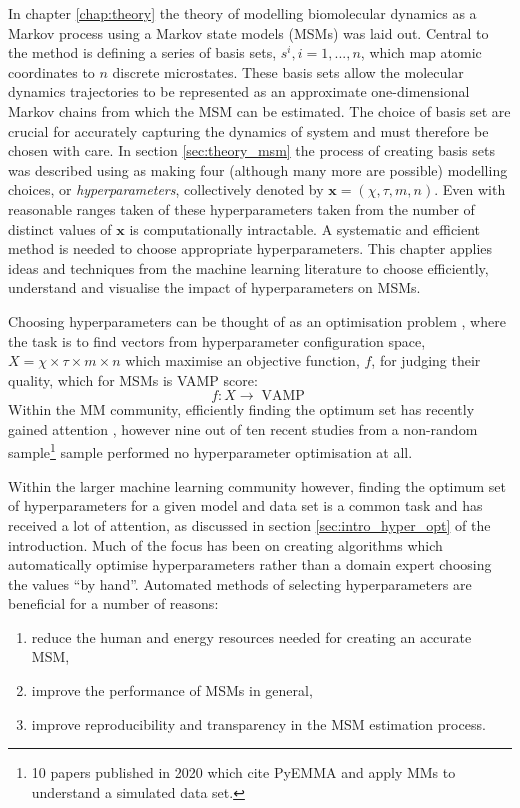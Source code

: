 In chapter \ref{chap:theory} the theory of modelling biomolecular dynamics as a Markov process using a Markov state models (MSMs) was laid out. Central to the method is defining  a series of basis sets, $s^i, i=1, ..., n$, which  map atomic coordinates to $n$ discrete microstates. These basis sets allow the molecular dynamics trajectories to be represented as an approximate one-dimensional Markov chains from which the MSM can be estimated. The choice of basis set are crucial for accurately capturing the dynamics of system \cite{husicOptimizedParameterSelection2016} and must therefore be chosen with care. In section \ref{sec:theory_msm} the process of creating basis sets was described using as making four (although many more are possible) modelling choices, or  \emph{hyperparameters}, collectively denoted by $\mathbf{x} = (\chi, \tau, m, n)$. Even with reasonable ranges taken of these hyperparameters taken from \cite{husicOptimizedParameterSelection2016} the number of distinct values of $\mathbf{x}$ is computationally intractable. A systematic and efficient method is needed to choose appropriate hyperparameters. This chapter applies ideas and techniques from the machine learning literature to choose efficiently, understand and visualise the impact of hyperparameters on MSMs. 

Choosing hyperparameters can be thought of as an optimisation problem\cite{feurer2019hyperparameter}\cite{jonesEfficientGlobalOptimization1998} , where the task is to find  vectors from hyperparameter configuration space, $X=\chi \times \tau \times m \times n$  which maximise an objective function, $f$, for judging their quality, which for MSMs is VAMP score:  
\begin{equation}
    f: X \rightarrow \operatorname{VAMP}
\end{equation}
Within the MM community, efficiently finding the optimum set has recently gained attention \cite{schererVariationalSelectionFeatures2019}, however nine out of ten recent studies from a non-random sample\footnote{10 papers published in 2020 which cite PyEMMA \cite{schererPyEMMASoftwarePackage2015a} and apply MMs to understand a simulated data set.} sample performed no hyperparameter optimisation at all.  

Within the larger machine learning community however, finding the optimum set of hyperparameters for a given model and data set is a common task and has received a lot of attention, as discussed in section \ref{sec:intro_hyper_opt} of the introduction. Much of the focus has been on creating algorithms which automatically optimise hyperparameters rather than a domain expert choosing the values ``by hand''.\cite{feurer2019hyperparameter}  Automated methods of selecting hyperparameters are beneficial for a number of reasons: \cite{feurer2019hyperparameter}
\begin{enumerate}
    \item reduce the human and energy resources needed for creating an accurate MSM, 
    \item improve the performance of MSMs in general,
    \item improve reproducibility and transparency in the MSM estimation process. 
\end{enumerate}

